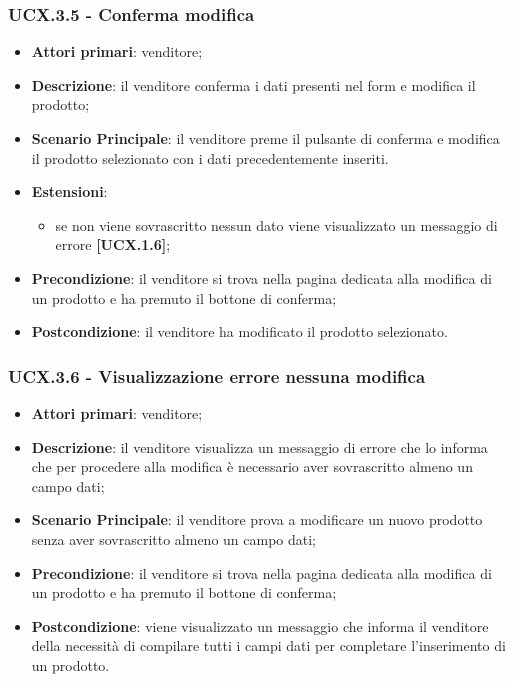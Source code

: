 \subsubsection{UCX.3.5 - Conferma modifica}
\begin{itemize}
\item \textbf{Attori primari}: venditore;
\item \textbf{Descrizione}: il venditore conferma i dati presenti nel form e modifica il prodotto;
\item \textbf{Scenario Principale}: il venditore preme il pulsante di conferma e modifica il prodotto selezionato con i dati precedentemente inseriti.
\item \textbf{Estensioni}: 
\begin{itemize}
	\item se non viene sovrascritto nessun dato viene visualizzato un messaggio di errore \textbf{[UCX.1.6]};
\end{itemize} 
\item \textbf{Precondizione}: il venditore si trova nella pagina dedicata alla modifica di un prodotto e ha premuto il bottone di conferma;
\item \textbf{Postcondizione}: il venditore ha modificato il prodotto selezionato.
\end{itemize}

\subsubsection{UCX.3.6 - Visualizzazione errore nessuna modifica}
\begin{itemize}
\item \textbf{Attori primari}: venditore;
\item \textbf{Descrizione}: il venditore visualizza un messaggio di errore che lo informa che per procedere alla modifica è necessario aver sovrascritto almeno un campo dati;
\item \textbf{Scenario Principale}: il venditore prova a modificare un nuovo prodotto senza aver sovrascritto almeno un campo dati;
\item \textbf{Precondizione}: il venditore si trova nella pagina dedicata alla modifica di un prodotto e ha premuto il bottone di conferma;
\item \textbf{Postcondizione}: viene visualizzato un messaggio che informa il venditore della necessità di compilare tutti i campi dati per completare l'inserimento di un prodotto.
\end{itemize}

